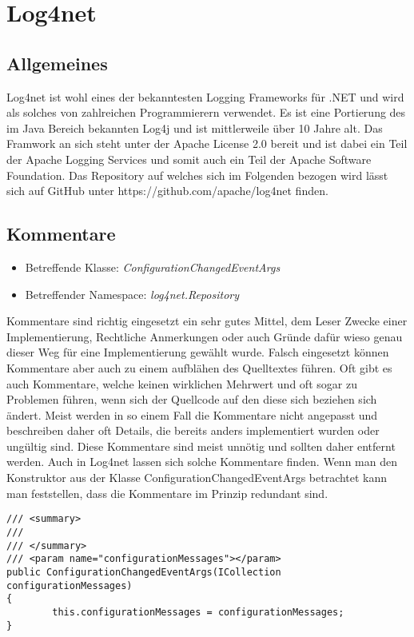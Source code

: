 \section{Log4net}
\subsection{Allgemeines}
Log4net ist wohl eines der bekanntesten Logging Frameworks für .NET und wird als solches von zahlreichen Programmierern verwendet. Es ist eine Portierung des im Java Bereich bekannten Log4j und ist mittlerweile über 10 Jahre alt. Das Framwork an sich steht unter der Apache License 2.0 bereit und ist dabei ein Teil der Apache Logging Services und somit auch ein Teil der Apache Software Foundation. Das Repository auf welches sich im Folgenden bezogen wird lässt sich auf GitHub unter https://github.com/apache/log4net finden.

\subsection{Kommentare}
\begin{itemize}
	\item Betreffende Klasse: \textit{ConfigurationChangedEventArgs}
	\item Betreffender Namespace: \textit{log4net.Repository}
\end{itemize}

Kommentare sind richtig eingesetzt ein sehr gutes Mittel, dem Leser Zwecke einer Implementierung, Rechtliche Anmerkungen oder auch Gründe dafür wieso genau dieser Weg für eine Implementierung gewählt wurde. Falsch eingesetzt können Kommentare aber auch zu einem aufblähen des Quelltextes führen. Oft gibt es auch Kommentare, welche keinen wirklichen Mehrwert und oft sogar zu Problemen führen, wenn sich der Quellcode auf den diese sich beziehen sich ändert. Meist werden in so einem Fall die Kommentare nicht angepasst und beschreiben daher oft Details, die bereits anders implementiert wurden oder ungültig sind. Diese Kommentare sind meist unnötig und sollten daher entfernt werden. Auch in Log4net lassen sich solche Kommentare finden. Wenn man den Konstruktor aus der Klasse ConfigurationChangedEventArgs betrachtet kann man feststellen, dass die Kommentare im Prinzip redundant sind.

\begin{lstlisting}[language={[Sharp]C}, caption=Beispiele für überflüssige Kommentare, label=lst:RedundantComment]
/// <summary>
/// 
/// </summary>
/// <param name="configurationMessages"></param>
public ConfigurationChangedEventArgs(ICollection configurationMessages)
{
		this.configurationMessages = configurationMessages;
}
\end{lstlisting}

